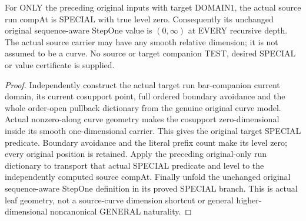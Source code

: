 \begin{theorem}
\label{hir:original-curve-run-companion-smooth-special-leaf}
\leanok
For ONLY the preceding original inputs with target DOMAIN$1$, the actual
source run compAt is SPECIAL with true level zero. Consequently its unchanged
original sequence-aware StepOne value is $(0,\infty)$ at EVERY recursive
depth. The actual source carrier may have any smooth relative dimension;
it is not assumed to be a curve. No source or target companion TEST, desired
SPECIAL or value certificate is supplied.
\end{theorem}
\begin{proof}
Independently construct the actual target run bar-companion current domain,
its current cosupport point, full ordered boundary avoidance and the whole
order-open pullback dictionary from the genuine original curve model.
Actual nonzero-along curve geometry makes the cosupport zero-dimensional
inside its smooth one-dimensional carrier. This gives the original target
SPECIAL predicate. Boundary avoidance and the literal prefix count make its
level zero; every original position is retained. Apply the preceding
original-only run dictionary to transport that actual SPECIAL predicate and
level to the independently computed source compAt. Finally unfold the
unchanged original sequence-aware StepOne definition in its proved SPECIAL
branch. This is actual leaf geometry, not a source-curve dimension shortcut
or general higher-dimensional noncanonical GENERAL naturality.
\end{proof}
